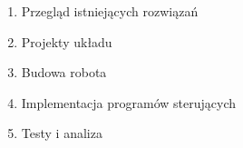\begin{enumerate}
 \item Przegląd istniejących rozwiązań
 \item Projekty układu
 \item Budowa robota
 \item Implementacja programów sterujących
 \item Testy i analiza
\end{enumerate}